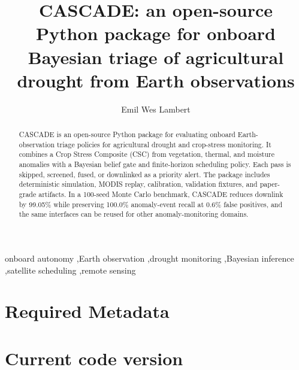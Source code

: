 \documentclass[preprint,12pt,a4paper]{elsarticle}
\begin{document}
\begin{frontmatter}

\title{CASCADE: an open-source Python package for onboard Bayesian triage of agricultural drought from Earth observations}

\author[tudelft]{Emil Wes Lambert}
\address[tudelft]{Delft University of Technology, Faculty of Aerospace Engineering, Delft, The Netherlands}

\begin{abstract}
CASCADE is an open-source Python package for evaluating onboard Earth-observation triage policies for agricultural drought and crop-stress monitoring. It combines a Crop Stress Composite (CSC) from vegetation, thermal, and moisture anomalies with a Bayesian belief gate and finite-horizon scheduling policy. Each pass is skipped, screened, fused, or downlinked as a priority alert. The package includes deterministic simulation, MODIS replay, calibration, validation fixtures, and paper-grade artifacts. In a 100-seed Monte Carlo benchmark, CASCADE reduces downlink by 99.05\% while preserving 100.0\% anomaly-event recall at 0.6\% false positives, and the same interfaces can be reused for other anomaly-monitoring domains.
\end{abstract}

\begin{keyword}
onboard autonomy \sep Earth observation \sep drought monitoring \sep Bayesian inference \sep satellite scheduling \sep remote sensing
\end{keyword}

\end{frontmatter}

\section*{Required Metadata}

\section*{Current code version}
\end{document}
